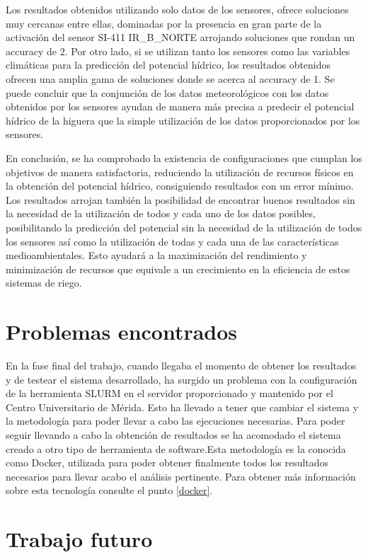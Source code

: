 Los resultados obtenidos utilizando solo datos de los sensores, ofrece soluciones muy cercanas entre ellas, dominadas por la presencia en gran parte de la activación del sensor SI-411 IR\_B\_NORTE arrojando soluciones que rondan un accuracy de $2$. Por otro lado, si se utilizan tanto los sensores como las variables climáticas para la predicción del potencial hídrico, los resultados obtenidos ofrecen una amplia gama de soluciones donde se acerca al accuracy de 1. Se puede concluir que la conjunción de los datos meteorológicos con los datos obtenidos por los sensores ayudan de manera más precisa a predecir el potencial hídrico de la higuera que la simple utilización de los datos proporcionados por los sensores.

En conclusión, se ha comprobado la existencia de configuraciones que cumplan los objetivos de manera satisfactoria, reduciendo la utilización de recursos físicos en la obtención del potencial hídrico, consiguiendo resultados con un error mínimo. Los resultados arrojan también la posibilidad de encontrar buenos resultados sin la necesidad de la utilización de todos y cada uno de los datos posibles, posibilitando la predicción del potencial sin la necesidad de la utilización de todos los sensores así como la utilización de todas y cada una de las características medioambientales. Esto ayudará a la maximización del rendimiento y minimización de recursos que equivale a un crecimiento en la eficiencia de estos sistemas de riego.

\section{Problemas encontrados}
En la fase final del trabajo, cuando llegaba el momento de obtener los resultados y de testear el sistema desarrollado, ha surgido un problema con la configuración de la herramienta SLURM en el servidor proporcionado y mantenido por el Centro Universitario de Mérida. Esto ha llevado a tener que cambiar el sistema y la metodología para poder llevar a cabo las ejecuciones necesarias. Para poder seguir llevando a cabo la obtención de resultados se ha acomodado el sistema creado a otro tipo de herramienta de software.Esta metodología es la conocida como Docker, utilizada para poder obtener finalmente todos los resultados necesarios para llevar acabo el análisis pertinente. Para obtener más información sobre esta tecnología consulte el punto \ref{docker}.


\section{Trabajo futuro}

